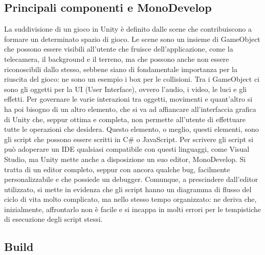 \subsection{Principali componenti e MonoDevelop}

La suddivisione di un gioco in Unity è definito dalle scene che contribuiscono a formare un determinato spazio di gioco. Le scene sono un insieme di GameObject che possono essere visibili all’utente che fruisce dell’applicazione, come la telecamera, il background e il terreno, ma che possono anche non essere riconoscibili dallo stesso, sebbene siano di fondamentale importanza per la riuscita del gioco: ne sono un esempio i box per le collisioni.
Tra i GameObject ci sono gli oggetti per la UI (User Interface), ovvero l’audio, i video, le luci e gli effetti. Per governare le varie interazioni tra oggetti, movimenti e quant’altro si ha poi bisogno di un altro elemento, che si va ad affiancare all’interfaccia grafica di Unity che, seppur ottima e completa, non permette all’utente di effettuare tutte le operazioni che desidera. Questo elemento, o meglio, questi elementi, sono gli script che possono essere scritti in C\#  o JavaScript. Per scrivere gli script si può adoperare un IDE qualsiasi compatibile con questi linguaggi, come Visual Studio, ma Unity mette anche a disposizione un suo editor, MonoDevelop. Si tratta di un editor completo, seppur con ancora qualche bug, facilmente personalizzabile e che possiede un debugger.
Comunque, a prescindere dall’editor utilizzato, si mette in evidenza che gli script hanno un diagramma di flusso del ciclo di vita molto complicato, ma nello stesso tempo organizzato: ne deriva che, inizialmente, affrontarlo non è facile e si incappa in molti errori per le tempistiche di esecuzione degli script stessi.

\subsection{Build}

